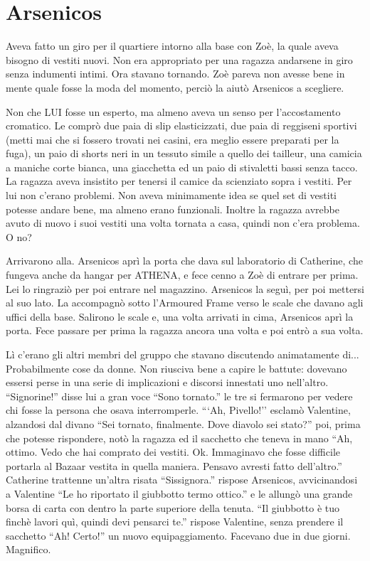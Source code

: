   \section*{Arsenicos}

    Aveva fatto un giro per il quartiere intorno alla base con Zoè, la quale aveva bisogno di vestiti nuovi. Non era
    appropriato per una ragazza andarsene in giro senza indumenti intimi. Ora stavano tornando. Zoè pareva non avesse
    bene in mente quale fosse la moda del momento, perciò la aiutò Arsenicos a scegliere.

    Non che LUI fosse un esperto, ma almeno aveva un senso per l'accostamento cromatico. Le comprò due paia di slip
    elasticizzati, due paia di reggiseni sportivi (metti mai che si fossero trovati nei casini, era meglio essere
    preparati per la fuga), un paio di shorts neri in un tessuto simile a quello dei tailleur, una camicia a maniche corte bianca, una giacchetta ed un paio di
    stivaletti bassi senza tacco. La ragazza aveva insistito per tenersi il camice da scienziato sopra i vestiti. Per
    lui non c'erano problemi. Non aveva minimamente idea se quel set di vestiti potesse andare bene, ma almeno erano
    funzionali. Inoltre la ragazza avrebbe avuto di nuovo i suoi vestiti una volta tornata a casa, quindi non c'era
    problema. O no?

    Arrivarono alla. Arsenicos aprì la porta che dava sul laboratorio di Catherine, che fungeva anche da hangar per
    ATHENA, e fece cenno a Zoè di entrare per prima. Lei lo ringraziò per poi entrare nel magazzino. Arsenicos la seguì,
    per poi mettersi al suo lato. La accompagnò sotto l'Armoured Frame verso le scale che davano agli uffici della base.
    Salirono le scale e, una volta arrivati in cima, Arsenicos aprì la porta. Fece passare per prima la ragazza ancora
    una volta e poi entrò a sua volta.

    Lì c'erano gli altri membri del gruppo che stavano discutendo animatamente di... Probabilmente cose da donne. Non
    riusciva bene a capire le battute: dovevano essersi perse in una serie di implicazioni e discorsi innestati uno
    nell'altro. ``Signorine!'' disse lui a gran voce ``Sono tornato.'' le tre si fermarono per vedere chi fosse la
    persona che osava interromperle. ```Ah, Pivello!'' esclamò Valentine, alzandosi dal divano ``Sei tornato,
    finalmente. Dove diavolo sei stato?'' poi, prima che potesse rispondere, notò la ragazza ed il sacchetto che teneva
    in mano ``Ah, ottimo. Vedo che hai comprato dei vestiti. Ok. Immaginavo che fosse difficile portarla al Bazaar
    vestita in quella maniera. Pensavo avresti fatto dell'altro.'' Catherine trattenne un'altra risata ``Sissignora.''
    rispose Arsenicos, avvicinandosi a Valentine ``Le ho riportato il giubbotto termo ottico.'' e le allungò una grande
    borsa di carta con dentro la parte superiore della tenuta. ``Il giubbotto è tuo finchè lavori quì, quindi devi
    pensarci te.'' rispose Valentine, senza prendere il sacchetto ``Ah! Certo!'' un nuovo equipaggiamento. Facevano due
    in due giorni. Magnifico.

